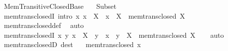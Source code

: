 %
\begin{isabellebody}%
%
%
\isadelimdocument
%
\endisadelimdocument
%
\isatagdocument
%
\isamarkuptrue%
%
\endisatagdocument
{\isafolddocument}%
%
\isadelimdocument
%
\endisadelimdocument
%
\isadelimtheory
%
\endisadelimtheory
%
\isatagtheory
{}\isamarkupfalse%
\ Mem{\isacharunderscore}{\kern0pt}Transitive{\isacharunderscore}{\kern0pt}Closed{\isacharunderscore}{\kern0pt}Base\isanewline
\ \ \ Subset\isanewline
{}%
\endisatagtheory
{\isafoldtheory}%
%
\isadelimtheory
\isanewline
%
\endisadelimtheory
\isanewline
{}\isamarkupfalse%
\ mem{\isacharunderscore}{\kern0pt}trans{\isacharunderscore}{\kern0pt}closedI\ {\isacharbrackleft}{\kern0pt}intro{\isacharbrackright}{\kern0pt}{\isacharcolon}{\kern0pt}\ {\isachardoublequoteopen}{\isacharparenleft}{\kern0pt}{\isasymAnd}x{\isachardot}{\kern0pt}\ x\ {\isasymin}\ X\ {\isasymLongrightarrow}\ x\ {\isasymsubseteq}\ X{\isacharparenright}{\kern0pt}\ {\isasymLongrightarrow}\ mem{\isacharunderscore}{\kern0pt}trans{\isacharunderscore}{\kern0pt}closed\ X{\isachardoublequoteclose}\isanewline
%
\isadelimproof
\ \ %
\endisadelimproof
%
\isatagproof
{}\isamarkupfalse%
\ mem{\isacharunderscore}{\kern0pt}trans{\isacharunderscore}{\kern0pt}closed{\isacharunderscore}{\kern0pt}def\ \isamarkupfalse%
\ auto%
\endisatagproof
{\isafoldproof}%
%
\isadelimproof
\isanewline
%
\endisadelimproof
\isanewline
{}\isamarkupfalse%
\ mem{\isacharunderscore}{\kern0pt}trans{\isacharunderscore}{\kern0pt}closedI{\isacharprime}{\kern0pt}{\isacharcolon}{\kern0pt}\ {\isachardoublequoteopen}{\isacharparenleft}{\kern0pt}{\isasymAnd}x\ y{\isachardot}{\kern0pt}\ x\ {\isasymin}\ X\ {\isasymLongrightarrow}\ y\ {\isasymin}\ x\ {\isasymLongrightarrow}\ y\ {\isasymin}\ X{\isacharparenright}{\kern0pt}\ {\isasymLongrightarrow}\ mem{\isacharunderscore}{\kern0pt}trans{\isacharunderscore}{\kern0pt}closed\ X{\isachardoublequoteclose}\isanewline
%
\isadelimproof
\ \ %
\endisadelimproof
%
\isatagproof
{}\isamarkupfalse%
\ auto%
\endisatagproof
{\isafoldproof}%
%
\isadelimproof
\isanewline
%
\endisadelimproof
\isanewline
{}\isamarkupfalse%
\ mem{\isacharunderscore}{\kern0pt}trans{\isacharunderscore}{\kern0pt}closedD\ {\isacharbrackleft}{\kern0pt}dest{\isacharbrackright}{\kern0pt}{\isacharcolon}{\kern0pt}\isanewline
\ \ \ {\isachardoublequoteopen}mem{\isacharunderscore}{\kern0pt}trans{\isacharunderscore}{\kern0pt}closed\ x{\isachardoublequoteclose}\isanewline

\end{isabellebody}
